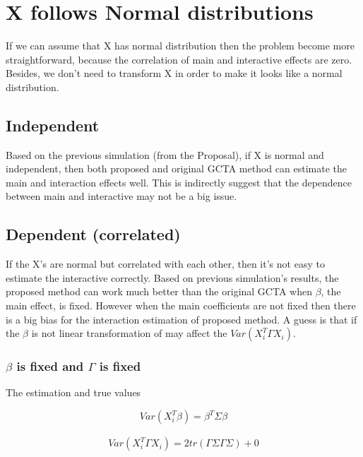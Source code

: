 \documentclass[]{article}
\begin{document}
\section{X follows Normal
distributions}\label{x-follows-normal-distributions}

If we can assume that X has normal distribution then the problem become
more straightforward, because the correlation of main and interactive
effects are zero. Besides, we don't need to transform X in order to make
it looks like a normal distribution.

\subsection{Independent}\label{independent}

Based on the previous simulation (from the Proposal), if X is normal and
independent, then both proposed and original GCTA method can estimate
the main and interaction effects well. This is indirectly suggest that
the dependence between main and interactive may not be a big issue.

\subsection{Dependent (correlated)}\label{dependent-correlated}

If the X's are normal but correlated with each other, then it's not easy
to estimate the interactive correctly. Based on previous simulation's
results, the proposed method can work much better than the original GCTA
when \(\beta\), the main effect, is fixed. However when the main
coefficients are not fixed then there is a big bias for the interaction
estimation of proposed method. A guess is that if the \(\beta\) is not
linear transformation of may affect the \(Var(X_i^T\Gamma X_i)\).

\subsubsection{\texorpdfstring{\(\beta\) is fixed and \(\Gamma\) is
fixed}{\textbackslash{}beta is fixed and \textbackslash{}Gamma is fixed}}\label{beta-is-fixed-and-gamma-is-fixed}

The estimation and true values

\[
    Var(X_i^T\beta) = \beta^T \Sigma \beta
\]

\begin{align*}
    Var(X_i^T\Gamma X_i) = 2tr(\Gamma \Sigma \Gamma \Sigma) + 0
\end{align*}
\end{document}
